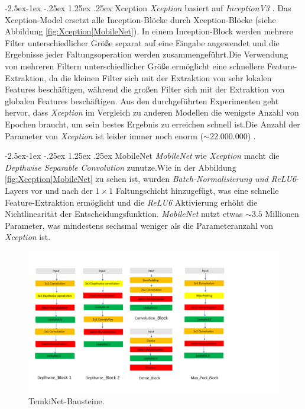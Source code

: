\documentclass[12pt,a4paper]{scrartcl}
\makeatletter
\numberwithin{equation}{section}
\renewcommand\paragraph{\@startsection{paragraph}{4}{\z@}%
	{-2.5ex\@plus -1ex \@minus -.25ex}%
	{1.25ex \@plus .25ex}%
	{\normalfont\normalsize\bfseries}}
\makeatother
\begin{document}
\paragraph{Xception}\label{Xception}
\textit{Xception} \cite{Xception} basiert auf  \textit{InceptionV3} \cite{InceptionV3}. 
Das Xception-Model ersetzt alle Inception-Blöcke durch Xception-Blöcke (siehe Abbildung \ref{fig:Xception|MobileNet}). In einem Inception-Block werden mehrere Filter unterschiedlicher Größe separat auf eine Eingabe angewendet und die Ergebnisse jeder Faltungsoperation werden zusammengeführt.Die Verwendung von mehreren Filtern unterschiedlicher Größe ermöglicht eine schnellere Feature-Extraktion, da die kleinen Filter sich mit der Extraktion von sehr lokalen Features beschäftigen, während die großen Filter sich mit der Extraktion von globalen Features beschäftigen. Aus den durchgeführten Experimenten geht hervor, dass \textit{Xception} im Vergleich zu anderen Modellen die wenigste Anzahl von Epochen braucht, um sein bestes Ergebnis zu erreichen schnell ist.Die Anzahl der Parameter von \textit{Xception} ist leider immer noch enorm ($ \sim22.000.000 $) .

\paragraph{MobileNet}
\textit{MobileNet} \cite{MobileNet} wie \textit{Xception} macht die \textit{Depthwise Separable Convolution} zunutze.Wie in der Abbildung \ref{fig:Xception|MobileNet} zu sehen ist, wurden \textit{Batch-Normalisierung und ReLU6}- Layers vor und nach der $ 1\times1 $ Faltungschicht hinzugefügt, was eine schnelle Feature-Extraktion ermöglicht und die \textit{ReLU6} Aktivierung erhöht die Nichtlinearität der Entscheidungsfunktion. \textit{MobileNet} nutzt etwas $\sim 3.5$ Millionen Parameter, was mindestens sechsmal weniger als die Parameteranzahl von \textit{Xception} ist.

\begin{figure}[h!]
\centering
\includegraphics[width=\textwidth ]{Convolution/Folie4}
\caption{TemkiNet-Bausteine.}
\label{fig:TEMKENG_NET}
\end{figure}
\end{document}
